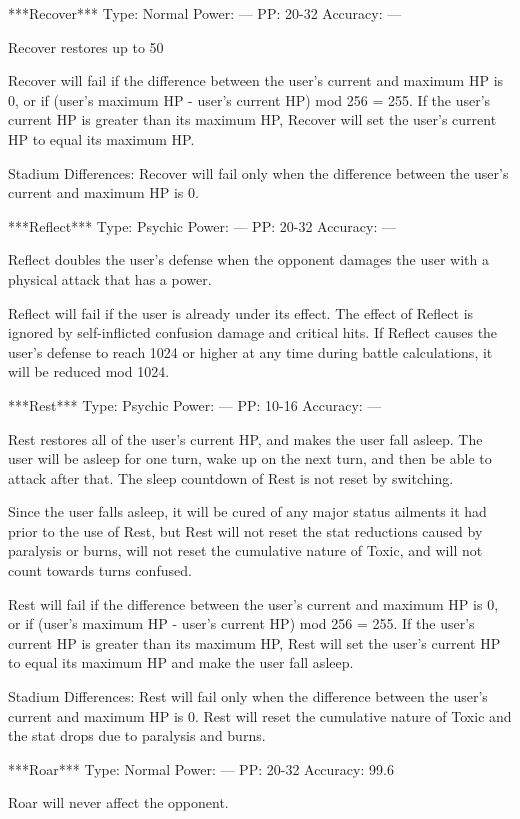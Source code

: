 \documentclass[reprint, aps, prl, paper=A4]{revtex4-1}
\begin{document}
***Recover***
Type: Normal
Power: ---
PP: 20-32
Accuracy: ---

Recover restores up to 50%

Recover will fail if the difference between the user's current and maximum HP is 0, or if
(user's maximum HP - user's current HP) mod 256 = 255. If the user's current HP is greater than
its maximum HP, Recover will set the user's current HP to equal its maximum HP.

Stadium Differences:
Recover will fail only when the difference between the user's current and maximum HP is 0.


***Reflect***
Type: Psychic
Power: ---
PP: 20-32
Accuracy: ---

Reflect doubles the user's defense when the opponent damages the user with a physical attack
that has a power.

Reflect will fail if the user is already under its effect. The effect of Reflect is ignored by
self-inflicted confusion damage and critical hits. If Reflect causes the user's defense to
reach 1024 or higher at any time during battle calculations, it will be reduced mod 1024.


***Rest***
Type: Psychic
Power: ---
PP: 10-16
Accuracy: ---

Rest restores all of the user's current HP, and makes the user fall asleep. The user will be
asleep for one turn, wake up on the next turn, and then be able to attack after that. The sleep
countdown of Rest is not reset by switching.

Since the user falls asleep, it will be cured of any major status ailments it had prior to the
use of Rest, but Rest will not reset the stat reductions caused by paralysis or burns, will not
reset the cumulative nature of Toxic, and will not count towards turns confused.

Rest will fail if the difference between the user's current and maximum HP is 0, or if
(user's maximum HP - user's current HP) mod 256 = 255. If the user's current HP is greater than
its maximum HP, Rest will set the user's current HP to equal its maximum HP and make the user
fall asleep.

Stadium Differences:
Rest will fail only when the difference between the user's current and maximum HP is 0. Rest
will reset the cumulative nature of Toxic and the stat drops due to paralysis and burns.


***Roar***
Type: Normal
Power: ---
PP: 20-32
Accuracy: 99.6%

Roar will never affect the opponent.
\end{document}
